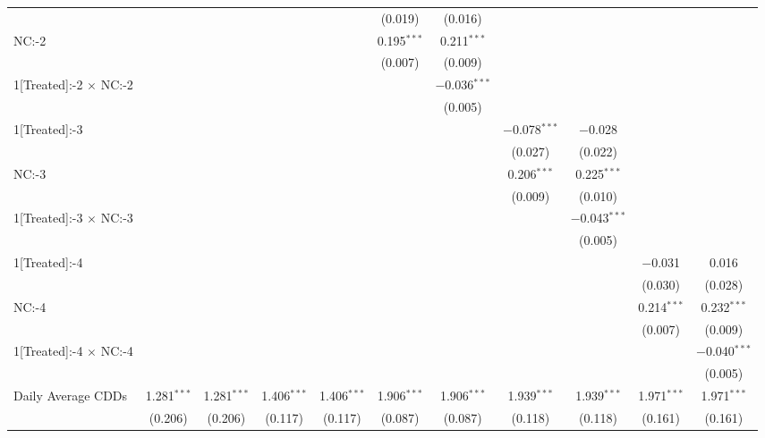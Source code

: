 \begin{table}[!htbp]
\begin{adjustbox}{scale = 0.75}
\begin{tabular}{@{\extracolsep{5pt}}lcccccccccc}
  &  &  &  &  & (0.019) & (0.016) &  &  &  &  \\ 
 NC:-2 &  &  &  &  & 0.195$^{***}$ & 0.211$^{***}$ &  &  &  &  \\ 
  &  &  &  &  & (0.007) & (0.009) &  &  &  &  \\ 
 1[Treated]:-2 $\times$ NC:-2 &  &  &  &  &  & $-$0.036$^{***}$ &  &  &  &  \\ 
  &  &  &  &  &  & (0.005) &  &  &  &  \\ 
 1[Treated]:-3 &  &  &  &  &  &  & $-$0.078$^{***}$ & $-$0.028 &  &  \\ 
  &  &  &  &  &  &  & (0.027) & (0.022) &  &  \\ 
 NC:-3 &  &  &  &  &  &  & 0.206$^{***}$ & 0.225$^{***}$ &  &  \\ 
  &  &  &  &  &  &  & (0.009) & (0.010) &  &  \\ 
 1[Treated]:-3 $\times$ NC:-3 &  &  &  &  &  &  &  & $-$0.043$^{***}$ &  &  \\ 
  &  &  &  &  &  &  &  & (0.005) &  &  \\ 
 1[Treated]:-4 &  &  &  &  &  &  &  &  & $-$0.031 & 0.016 \\ 
  &  &  &  &  &  &  &  &  & (0.030) & (0.028) \\ 
 NC:-4 &  &  &  &  &  &  &  &  & 0.214$^{***}$ & 0.232$^{***}$ \\ 
  &  &  &  &  &  &  &  &  & (0.007) & (0.009) \\ 
 1[Treated]:-4 $\times$ NC:-4 &  &  &  &  &  &  &  &  &  & $-$0.040$^{***}$ \\ 
  &  &  &  &  &  &  &  &  &  & (0.005) \\ 
 Daily Average CDDs & 1.281$^{***}$ & 1.281$^{***}$ & 1.406$^{***}$ & 1.406$^{***}$ & 1.906$^{***}$ & 1.906$^{***}$ & 1.939$^{***}$ & 1.939$^{***}$ & 1.971$^{***}$ & 1.971$^{***}$ \\ 
  & (0.206) & (0.206) & (0.117) & (0.117) & (0.087) & (0.087) & (0.118) & (0.118) & (0.161) & (0.161) \\ 

\end{tabular}
\end{adjustbox}
\end{table}
